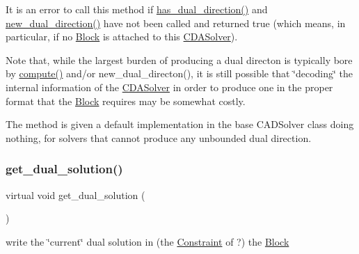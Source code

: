 It is an error to call this method if \mbox{\hyperlink{class_s_m_spp__di__unipi__it_1_1_c_d_a_solver_a4247feaa72c255f28a2a71b5e634b60a}{has\+\_\+dual\+\_\+direction()}} and \mbox{\hyperlink{class_s_m_spp__di__unipi__it_1_1_c_d_a_solver_ad83925e362d49bbe570a881791e45ea0}{new\+\_\+dual\+\_\+direction()}} have not been called and returned true (which means, in particular, if no \mbox{\hyperlink{class_s_m_spp__di__unipi__it_1_1_block}{Block}} is attached to this \mbox{\hyperlink{class_s_m_spp__di__unipi__it_1_1_c_d_a_solver}{C\+D\+A\+Solver}}).

Note that, while the largest burden of producing a dual directon is typically bore by \mbox{\hyperlink{class_s_m_spp__di__unipi__it_1_1_solver_a504d4e3e174c7a518cc66156a8a45ce5}{compute()}} and/or new\+\_\+dual\+\_\+directon(), it is still possible that \char`\"{}decoding\char`\"{} the internal information of the \mbox{\hyperlink{class_s_m_spp__di__unipi__it_1_1_c_d_a_solver}{C\+D\+A\+Solver}} in order to produce one in the proper format that the \mbox{\hyperlink{class_s_m_spp__di__unipi__it_1_1_block}{Block}} requires may be somewhat costly.

The method is given a default implementation in the base C\+A\+D\+Solver class doing nothing, for solvers that cannot produce any unbounded dual direction. \mbox{\label{class_s_m_spp__di__unipi__it_1_1_c_d_a_solver_a347d37171494bf83416a48b279b94d5a}} 
\subsubsection{\texorpdfstring{get\+\_\+dual\+\_\+solution()}{get\_dual\_solution()}}
{\footnotesize\ttfamily virtual void get\+\_\+dual\+\_\+solution (\begin{DoxyParamCaption}\item[{void}]{ }\end{DoxyParamCaption})\hspace{0.3cm}{\ttfamily [pure virtual]}}



write the \char`\"{}current\char`\"{} dual solution in (the \mbox{\hyperlink{class_s_m_spp__di__unipi__it_1_1_constraint}{Constraint}} of ?) the \mbox{\hyperlink{class_s_m_spp__di__unipi__it_1_1_block}{Block}} 

